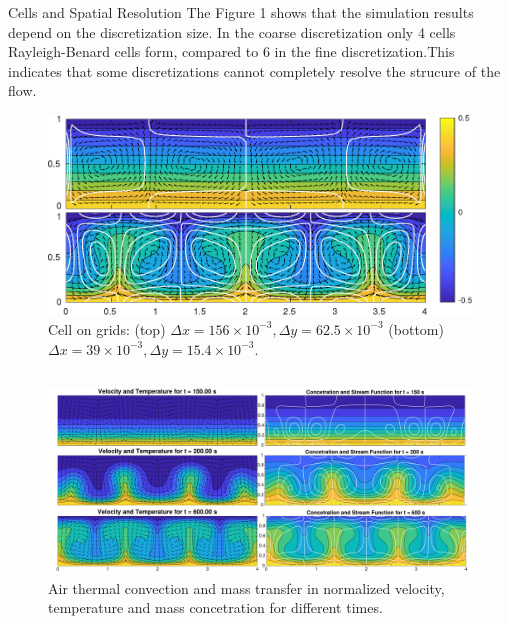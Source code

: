 \documentclass[final]{beamer}
\newlength{\onecolwid}
\newlength{\twocolwid}
\begin{document}
\begin{frame}[t]
\begin{columns}[t]
\begin{column}{\twocolwid}
\begin{columns}[t,totalwidth=\twocolwid]
\begin{column}{\onecolwid}
\begin{block}{Cells and Spatial Resolution}
	The Figure 1 shows that the simulation results depend on the discretization size. In the coarse discretization only 4 cells Rayleigh-Benard cells form, compared to 6 in the fine discretization.This indicates that some discretizations cannot completely resolve the strucure of the flow.
	\vspace{1em}
\begin{figure}
\includegraphics[width=1.0\linewidth]{images/cells.pdf}
	\caption{\hspace{1em}Cell on grids: (top) $\Delta x=156\times10^{-3}, \Delta y=62.5\times10^{-3}$ (bottom) $\Delta x=39\times10^{-3}, \Delta y=15.4\times10^{-3}.$}
\end{figure}
\end{block}


\end{column} %

\end{columns} %

\vspace{-2em}
\begin{figure}
\includegraphics[width=1.0\linewidth]{images/figure1.pdf}
\caption{Air thermal convection and mass transfer in normalized velocity, temperature and mass concetration for different times.}
\end{figure}


\end{column}
\end{columns}
\end{frame}
\end{document}
